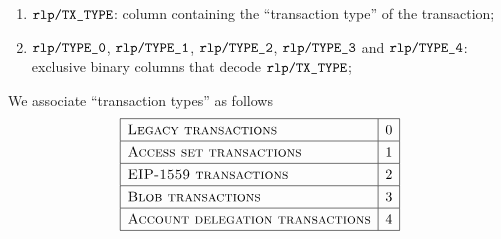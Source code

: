 \begin{enumerate}
	\item
		$\texttt{rlp} \texttt{/}{\texttt{TX\_TYPE}}$:
		column containing the ``transaction type'' of the transaction;
	\item 
		$\texttt{rlp} \texttt{/}{\texttt{\texttt{TYPE\_0}}}            $,
		$\texttt{rlp} \texttt{/}{\texttt{\texttt{TYPE\_1}}}         $,
		$\texttt{rlp} \texttt{/}{\texttt{\texttt{TYPE\_2}}}           $,
		$\texttt{rlp} \texttt{/}{\texttt{\texttt{TYPE\_3}}}              $ and
		$\texttt{rlp} \texttt{/}{\texttt{\texttt{TYPE\_4}}} $:
		exclusive binary columns that decode
		$\texttt{rlp} \texttt{/}{\texttt{TX\_TYPE}}$;
\end{enumerate}
We associate ``transaction types'' as follows
\[
	\renewcommand{\arraystretch}{1.3}
	\begin{array}{|l|c|}
		\hline
		\textsc{Legacy transactions}             & 0 \\ \hline
		\textsc{Access set transactions}         & 1 \\ \hline
		\textsc{EIP-1559 transactions}           & 2 \\ \hline
		\textsc{Blob transactions}               & 3 \\ \hline
		\textsc{Account delegation transactions} & 4 \\ \hline
	\end{array}
\]
